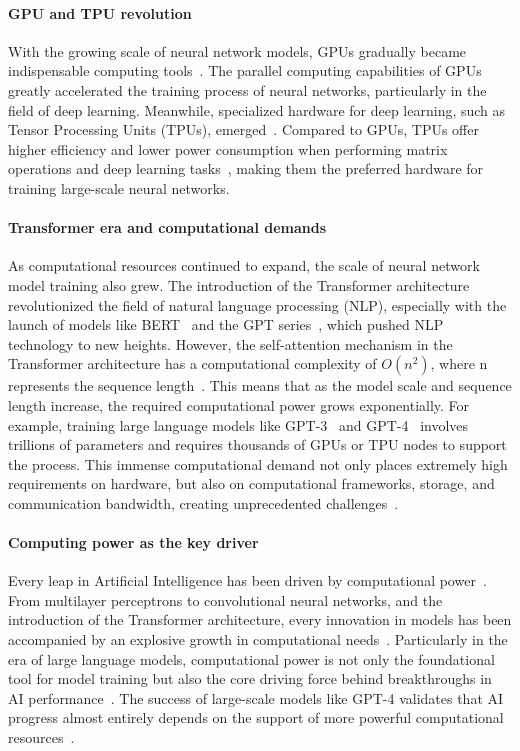 \paragraph{GPU and TPU revolution}
With the growing scale of neural network models, GPUs gradually became indispensable computing tools~\cite{raina2009large}. The parallel computing capabilities of GPUs greatly accelerated the training process of neural networks, particularly in the field of deep learning. Meanwhile, specialized hardware for deep learning, such as Tensor Processing Units (TPUs), emerged~\cite{jouppi2017datacenter}. Compared to GPUs, TPUs offer higher efficiency and lower power consumption when performing matrix operations and deep learning tasks~\cite{wang2019benchmarking}, making them the preferred hardware for training large-scale neural networks.

\paragraph{Transformer era and computational demands}
As computational resources continued to expand, the scale of neural network model training also grew. The introduction of the Transformer architecture~\cite{vaswani2017attention} revolutionized the field of natural language processing (NLP), especially with the launch of models like BERT~\cite{devlin2018bert} and the GPT series~\cite{brown2020language,openai2023gpt4}, which pushed NLP technology to new heights. However, the self-attention mechanism in the Transformer architecture has a computational complexity of $O(n^2)$, where n represents the sequence length~\cite{vaswani2017attention}. This means that as the model scale and sequence length increase, the required computational power grows exponentially. For example, training large language models like GPT-3~\cite{brown2020language} and GPT-4~\cite{openai2023gpt4} involves trillions of parameters and requires thousands of GPUs or TPU nodes to support the process. This immense computational demand not only places extremely high requirements on hardware, but also on computational frameworks, storage, and communication bandwidth, creating unprecedented challenges~\cite{patterson2021carbon}.

\paragraph{Computing power as the key driver}
Every leap in Artificial Intelligence has been driven by computational power~\cite{amodei2018ai}. From multilayer perceptrons to convolutional neural networks, and the introduction of the Transformer architecture, every innovation in models has been accompanied by an explosive growth in computational needs~\cite{thompson2020computational}. Particularly in the era of large language models, computational power is not only the foundational tool for model training but also the core driving force behind breakthroughs in AI performance~\cite{kaplan2020scaling}. The success of large-scale models like GPT-4 validates that AI progress almost entirely depends on the support of more powerful computational resources~\cite{hoffmann2022training}.



